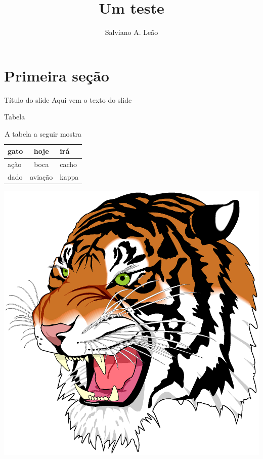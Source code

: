 \documentclass[style=aggie]{powerdot}
\title{Um teste}
\author{Salviano A. Leão}
\date{}
\begin{document}
\maketitle

\section{Primeira seção}

\begin{slide}{Título do slide}
Aqui vem o texto do slide
\end{slide}

\begin{slide}{Tabela}


\begin{multicols}{2}

\begin{table}[!htb]
\caption{A tabela a seguir mostra}
\begin{center}
\begin{tabular}{|l|c|l|} \hline
gato & hoje & irá\\ \hline
ação & boca & cacho\\
dado & aviação & kappa\\ \hline
\end{tabular}
\end{center}
\end{table}

\begin{center}
\includegraphics[width=0.9\linewidth]{tiger.eps}
\end{center}

\end{multicols}


\end{slide}
\end{document}

